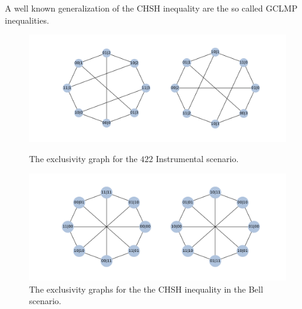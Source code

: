 \documentclass[letterpaper]{article}
\begin{document}
A well known generalization of the CHSH inequality are the so called GCLMP
\cite{} inequalities.


\begin{figure}[b]
    \centering
    \parbox{.9\columnwidth}{
        \includegraphics[width=\columnwidth]{images/422_exgraph.pdf}
        \caption{The exclusivity graph for the $422$ Instrumental scenario.}
        \label{fig:422_exgraph}
    }

    \bigskip
    \parbox{.9\columnwidth}{
        \includegraphics[width=\columnwidth]{images/gclmp_graphs.pdf}
        \caption{The exclusivity graphs for the the CHSH inequality in the Bell
        scenario.}
        \label{fig:chsh_exgraph}
    }
\end{figure}
\end{document}
